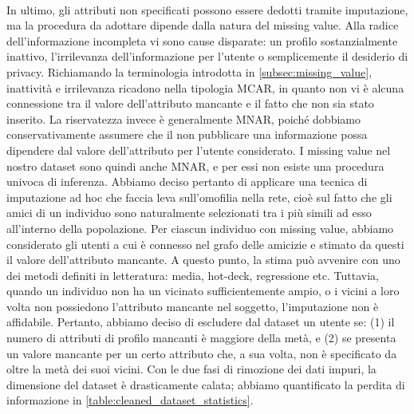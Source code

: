 \begin{table}[h]
\end{table}\\
In ultimo, gli attributi non specificati possono essere dedotti tramite imputazione, ma la procedura da adottare dipende dalla natura del missing value. Alla radice dell'informazione incompleta vi sono cause disparate: un profilo sostanzialmente inattivo, l'irrilevanza dell'informazione per l'utente o semplicemente il desiderio di privacy. Richiamando la terminologia introdotta in \autoref{subsec:missing_value}, inattivit\`a e irrilevanza ricadono nella tipologia MCAR, in quanto non vi \`e alcuna connessione tra il valore dell'attributo mancante e il fatto che non sia stato inserito. La riservatezza invece \`e generalmente MNAR, poich\'e dobbiamo conservativamente assumere che il non pubblicare una informazione possa dipendere dal valore dell'attributo per l'utente considerato. I missing value nel nostro dataset sono quindi anche MNAR, e per essi non esiste una procedura univoca di inferenza. Abbiamo deciso pertanto di applicare una tecnica di imputazione ad hoc che faccia leva sull'omofilia nella rete, cio\`e sul fatto che gli amici di un individuo sono naturalmente selezionati tra i pi\`u simili ad esso all'interno della popolazione. Per ciascun individuo con missing value, abbiamo considerato gli utenti a cui \`e connesso nel grafo delle amicizie e stimato da questi il valore dell'attributo mancante. A questo punto, la stima pu\`o avvenire con uno dei metodi definiti in letteratura: media, hot-deck, regressione etc. Tuttavia, quando un individuo non ha un vicinato sufficientemente ampio, o i vicini a loro volta non possiedono l'attributo mancante nel soggetto, l'imputazione non \`e affidabile. Pertanto, abbiamo deciso di escludere dal dataset un utente se: (1) il numero di attributi di profilo mancanti \`e maggiore della met\`a, e (2) se presenta un valore mancante per un certo attributo che, a sua volta, non \`e specificato da oltre la met\`a dei suoi vicini. Con le due fasi di rimozione dei dati impuri, la dimensione del dataset \`e drasticamente calata; abbiamo quantificato la perdita di informazione in \autoref{table:cleaned_dataset_statistics}.
